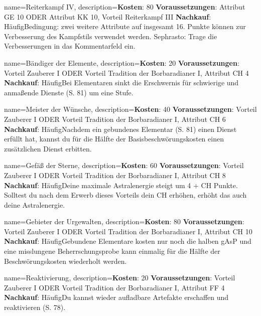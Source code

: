 {
    name={Reiterkampf IV},
    description={\textbf{Kosten}: 80 \textbf{Voraussetzungen}: Attribut GE 10 ODER Attribut KK 10, Vorteil Reiterkampf III \textbf{Nachkauf}: Häufig\newline Bedingung: zwei weitere Attribute auf insgesamt 16. Punkte können zur Verbesserung des Kampfstils verwendet werden. Sephrasto: Trage die Verbesserungen in das Kommentarfeld ein.}
}


{
    name={Bändiger der Elemente},
    description={\textbf{Kosten}: 20 \textbf{Voraussetzungen}: Vorteil Zauberer I ODER Vorteil Tradition der Borbaradianer I, Attribut CH 4 \textbf{Nachkauf}: Häufig\newline Bei Elementaren sinkt die Erschwernis für schwierige und anmaßende Dienste (S. 81) um eine Stufe.}
}


{
    name={Meister der Wünsche},
    description={\textbf{Kosten}: 40 \textbf{Voraussetzungen}: Vorteil Zauberer I ODER Vorteil Tradition der Borbaradianer I, Attribut CH 6 \textbf{Nachkauf}: Häufig\newline Nachdem ein gebundenes Elementar (S. 81) einen Dienst erfüllt hat, kannst du für die Hälfte der Basisbeschwörungskosten einen zusätzlichen Dienst erbitten.}
}


{
    name={Gefäß der Sterne},
    description={\textbf{Kosten}: 60 \textbf{Voraussetzungen}: Vorteil Zauberer I ODER Vorteil Tradition der Borbaradianer I, Attribut CH 8 \textbf{Nachkauf}: Häufig\newline Deine maximale Astralenergie steigt um 4 + CH Punkte. Solltest du nach dem Erwerb dieses Vorteils dein CH erhöhen, erhöht das auch deine Astralenergie.}
}


{
    name={Gebieter der Urgewalten},
    description={\textbf{Kosten}: 80 \textbf{Voraussetzungen}: Vorteil Zauberer I ODER Vorteil Tradition der Borbaradianer I, Attribut CH 10 \textbf{Nachkauf}: Häufig\newline Gebundene Elementare kosten nur noch die halben gAsP und eine misslungene Beherrschungsprobe kann einmalig für die Hälfte der Beschwörungskosten wiederholt werden.}
}


{
    name={Reaktivierung},
    description={\textbf{Kosten}: 20 \textbf{Voraussetzungen}: Vorteil Zauberer I ODER Vorteil Tradition der Borbaradianer I, Attribut FF 4 \textbf{Nachkauf}: Häufig\newline Du kannst wieder aufladbare Artefakte erschaffen und reaktivieren (S. 78).}
}


